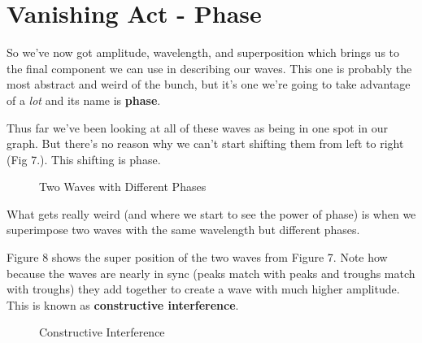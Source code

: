 \documentclass[12pt,a6paper]{book}
\begin{document}
\section{Vanishing Act - Phase}
So we've now got amplitude, wavelength, and superposition which brings us to the final component we can use in describing our waves. This one is probably the most abstract and weird of the bunch, but it's one we're going to take advantage of a \textit{lot} and its name is \textbf{phase}. 

Thus far we've been looking at all of these waves as being in one spot in our graph. But there's no reason why we can't start shifting them from left to right (Fig 7.). This shifting is phase.

\begin{figure}[!htb]
\caption{\label{fig:my-label} Two Waves with Different Phases}
\end{figure}

What gets really weird (and where we start to see the power of phase) is when we superimpose two waves with the same wavelength but different phases. 

Figure 8 shows the super position of the two waves from Figure 7. Note how because the waves are nearly in sync (peaks match with peaks and troughs match with troughs) they add together to create a wave with much higher amplitude. This is known as \textbf{constructive interference}.

\begin{figure}[!htb]
\caption{\label{fig:my-label} Constructive Interference}
\end{figure}
\end{document}
